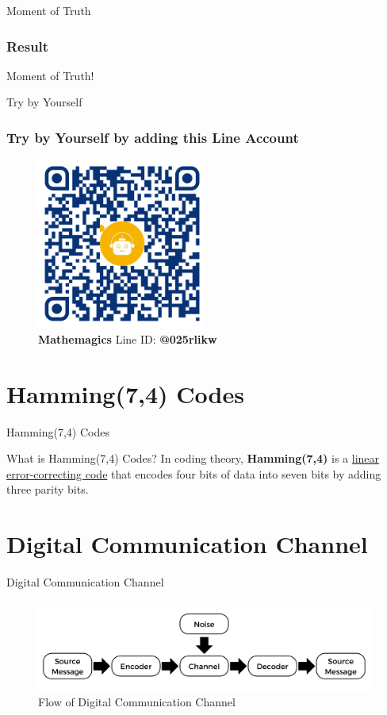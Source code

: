 \documentclass[10pt]{beamer}
\begin{document}
\begin{frame}{Moment of Truth}
\frametitle{Result}
    \centering
	\Huge{Moment of Truth!}
\end{frame}

\begin{frame}{Try by Yourself}
\frametitle{Try by Yourself by adding this \textbf{Line Account}}
    \begin{figure}
        \includegraphics[width=0.5\textwidth]{mathemagics.png}
        \caption{\textbf{Mathemagics} Line ID: \textbf{@025rlikw}}
    \end{figure}
\end{frame}

\section{Hamming(7,4) Codes}
\begin{frame}{Hamming(7,4) Codes}
    \begin{block}{What is Hamming(7,4) Codes?}
        \pause
        In coding theory, \textbf{Hamming(7,4)} is a \underline{linear error-correcting code} that encodes four bits of data into seven bits by adding three parity bits.
    \end{block}
\end{frame}

\section{Digital Communication Channel}
\begin{frame}{Digital Communication Channel}
    \begin{figure}
        \includegraphics[width=\textwidth]{channel.pdf}
        \caption{Flow of Digital Communication Channel}
    \end{figure}
\end{frame}
\end{document}
